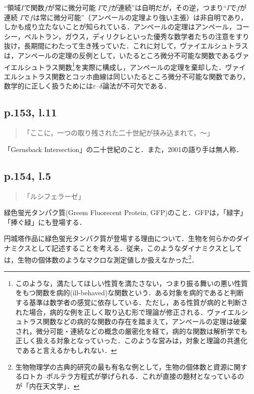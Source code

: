 \documentclass[10pt, a5paper, twoside]{ltjsarticle}
\newcommand{\hyphen}{\insertkanjiskip--\insertkanjiskip}
\begin{document}
            “領域$I$で関数$f$が常に微分可能\,\to\,$I$で$f$が連続”は自明だが，その逆，つまり“$I$で$f$が連続\,\to\,$I$で$f$は常に微分可能”（アンペールの定理より強い主張）は非自明であり，しかも成り立たないことが知られている．アンペールの定理はアンペール，コーシー，ベルトラン，ガウス，ディリクレといった優秀な数学者たちの注意をすり抜け，長期間にわたって生き残っていた．これに対して，ヴァイエルシュトラスは，アンペールの定理の反例として，いたるところ微分不可能な関数であるヴァイエルシュトラス関数\footnote{このような，満たしてほしい性質を満たさない，つまり振る舞いの悪い性質をもつ関数を病的(ill-behaved)な関数という．ある対象を病的であると判断する基準は数学者の感覚に依存している．ただし，ある性質が病的と判断された場合，病的な例を正しく取り込む形で理論が修正される．ヴァイエルシュトラス関数などの病的な関数の存在を踏まえて，アンペールの定理は破棄され，微分可能・連続などの概念の厳密化を経て，病的な関数は解析学でも正しく扱える対象となっていった．このような営みは，対象と理論の共進化であると言えるかもしれない．}を実際に構成し，アンペールの定理を棄却した．ヴァイエルシュトラス関数とコッホ曲線は同じいたるところ微分不可能な関数であり，数学的に正しく扱うためには$\varepsilon$--$\delta$論法が不可欠である．

        \subsection{p.153, l.11}

            \begin{quote}
                「ここに，一つの取り残された二十世紀が挟み込まれて，〜」
            \end{quote}

            「Gernsback Intersection」の二十世紀のこと．また，2001の語り手は無人称．

        \subsection{p.154, l.5}

            \begin{quote}
                「ルシフェラーゼ」
            \end{quote}

            緑色蛍光タンパク質(Greem Fluorecent Protein, GFP)のこと．GFPは，「緑字」「捧ぐ緑」にも登場する．

            円城塔作品に緑色蛍光タンパク質が登場する理由について．生物を何らかのダイナミクスとして記述することを考える．従来，このようなダイナミクスとしては，生物の個体数のようなマクロな測定値しか扱えなかった\footnote{生物物理学の古典的研究の最も有名な例として，生物の個体数と資源に関するロトカ\hyphen ボルテラ方程式が挙げられる．これが直接の題材となっているのが「内在天文学」．}．
\end{document}
